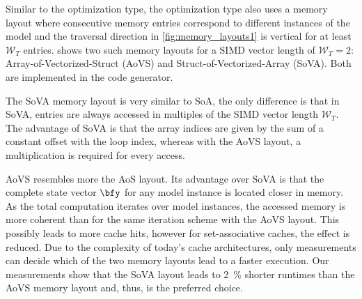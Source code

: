 Similar to the  optimization type, the  optimization type also uses a memory layout where consecutive memory entries correspond to different instances of the model and the traversal direction in \cref{fig:memory_layouts1} is vertical for at least $\mathcal{W}_T$ entries.  shows two such memory layouts for a SIMD vector length of $\mathcal{W}_T=2$: Array-of-Vectorized-Struct (AoVS) and Struct-of-Vectorized-Array (SoVA). Both are implemented in the code generator. 

The SoVA memory layout is very similar to SoA, the only difference is that in SoVA, entries are always accessed in multiples of the SIMD vector length $\mathcal{W}_T$. The advantage of SoVA is that the array indices are given by the sum of a constant offset with the loop index, whereas with the AoVS layout, a multiplication is required for every access.

AoVS resembles more the AoS layout. Its advantage over SoVA is that the complete state vector $\bfy$ for any model instance is located closer in memory. As the total computation iterates over model instances, the accessed memory is more coherent than for the same iteration scheme with the AoVS layout. This possibly leads to more cache hits, however for set-associative caches, the effect is reduced. Due to the complexity of today's cache architectures, only measurements can decide which of the two memory layouts lead to a faster execution. Our measurements show that the SoVA layout leads to \SI{2}{\percent} shorter runtimes than the AoVS memory layout and, thus, is the preferred choice.



% 


